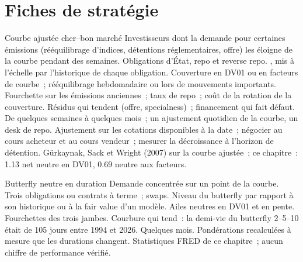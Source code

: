 \section{Fiches de stratégie}

\begin{strategyfile}{Courbe ajustée cher--bon marché}\label{strat:s2:government-bond-relative-value:richcheap}
 Investisseurs dont la demande pour certaines émissions (rééquilibrage d'indices, détentions réglementaires, offre) les éloigne
de la courbe pendant des semaines.
 Obligations d'État, repo et reverse repo.
 , mis à l'échelle par l'historique de chaque obligation.
 Couverture en DV01 ou en facteurs de courbe~; rééquilibrage hebdomadaire ou lors de mouvements importants.
 Fourchette sur les émissions anciennes~; taux de repo~; coût de la rotation de la couverture.
 Résidus qui tendent (offre, specialness)~; financement qui fait défaut.
 De quelques semaines à quelques mois~; un ajustement quotidien de la courbe, un desk de repo.
 Ajustement sur les cotations disponibles à la date~; négocier au cours acheteur et au cours vendeur~; mesurer la décroissance à l'horizon de détention.
 Gürkaynak, Sack et Wright (2007) sur la courbe ajustée~; ce chapitre~: 1.13 net neutre en DV01, 0.69 neutre aux facteurs.
\end{strategyfile}

\begin{strategyfile}{Butterfly neutre en duration}\label{strat:s2:government-bond-relative-value:fly}
 Demande concentrée sur un point de la courbe.
 Trois obligations ou contrats à terme~; swaps.
 Niveau du butterfly par rapport à son historique ou à la fair value d'un modèle.
 Ailes neutres en DV01 et en pente.
 Fourchettes des trois jambes.
 Courbure qui tend~: la demi-vie du butterfly 2--5--10 était de 105 jours entre 1994 et 2026.
 Quelques mois.
 Pondérations recalculées à mesure que les durations changent.
 Statistiques FRED de ce chapitre~; aucun chiffre de performance vérifié.
\end{strategyfile}

